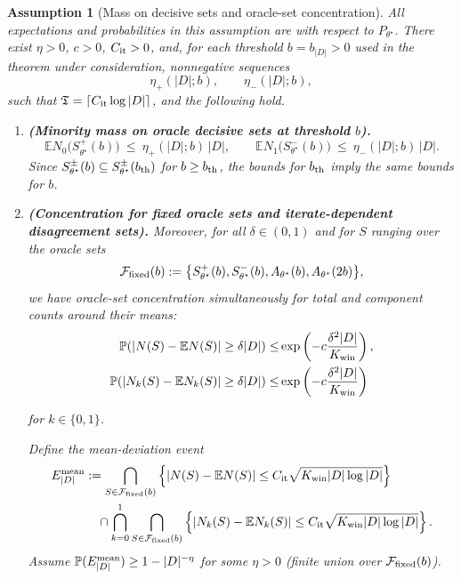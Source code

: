 \documentclass{statsoc}
\newtheorem{assumption}[assumption]{Assumption}
\newcommand{\bbE}{\mathbb{E}}
\newcommand{\bbP}{\mathbb{P}}
\newcommand{\1}{\mathbbm{1}}
\newcommand{\Tmax}{\mathfrak{T}}
\begin{document}
\begin{assumption}[Mass on decisive sets and oracle-set concentration]\label{ass:G8}
All expectations and probabilities in this assumption are with respect to $P_{\theta^\star}$.
There exist \(\eta>0\), \(c>0\), \(C_{\rm it}>0\), and, for each threshold \(b=b_{|D|}>0\) used in the theorem under consideration, nonnegative sequences
\[
\eta_+(|D|;b),\qquad \eta_-(|D|;b),
\]
such that \(\Tmax=\lceil C_{\rm it}\log|D|\rceil\), and the following hold.
\begin{enumerate}[nosep,label=(\roman*)]

\item \textbf{(Minority mass on oracle decisive sets at threshold \(b\)).}
\[
\bbE N_0\!\big(S_{\theta^\star}^+(b)\big)\ \le\ \eta_+(|D|;b)\,|D|,
\qquad
\bbE N_1\!\big(S_{\theta^\star}^-(b)\big)\ \le\ \eta_-(|D|;b)\,|D|.
\] Since $S_{\theta^\star}^\pm(b)\subseteq S_{\theta^\star}^\pm(b_{\rm th})$
for $b\ge b_{\rm th}$, the bounds for $b_{\rm th}$ imply the same bounds for $b$.

\item \textbf{(Concentration for fixed oracle sets and iterate-dependent disagreement sets).}
Moreover, for all $\delta\in(0,1)$ and for $S$ ranging over the oracle sets
\[
\mathcal F_{\rm fixed}(b):=\big\{S_{\theta^\star}^+(b), S_{\theta^\star}^-(b), A_{\theta^\star}(b), A_{\theta^\star}(2b)\big\},
\]
we have oracle-set concentration simultaneously for total and component counts around their means:
\begin{align*}
    \mathbb{P}\!\left(\left|N(S)-\bbE N(S)\right|\ge \delta|D|\right)\le& \exp\left(-c \frac{\delta^2|D|}{K_{\rm win}}\right),\\
\mathbb{P}\!\left(\left|N_k(S)-\bbE N_k(S)\right|\ge \delta|D|\right)\le& \exp\left(-c \frac{\delta^2|D|}{K_{\rm win}}\right)
\end{align*}

for $k\in\{0,1\}$.

Define the mean-deviation event
\begin{align*}
E^{\rm mean}_{|D|}
&:=
\bigcap_{S\in\mathcal F_{\rm fixed}(b)}
\left\{
\left|N(S)-\mathbb{E} N(S)\right|\le C_{\rm it}\sqrt{K_{\rm win}|D|\log|D|}
\right\} \\
&\quad\cap
\bigcap_{k=0}^1\bigcap_{S\in\mathcal F_{\rm fixed}(b)}
\left\{
\left|N_k(S)-\mathbb{E} N_k(S)\right|\le C_{\rm it}\sqrt{K_{\rm win}|D|\log|D|}
\right\}.
\end{align*}
Assume $\bbP(E^{\rm mean}_{|D|})\ge 1-|D|^{-\eta}$ for some $\eta>0$ (finite union over $\mathcal F_{\rm fixed}(b)$).


\end{enumerate}
\end{assumption}
\end{document}
